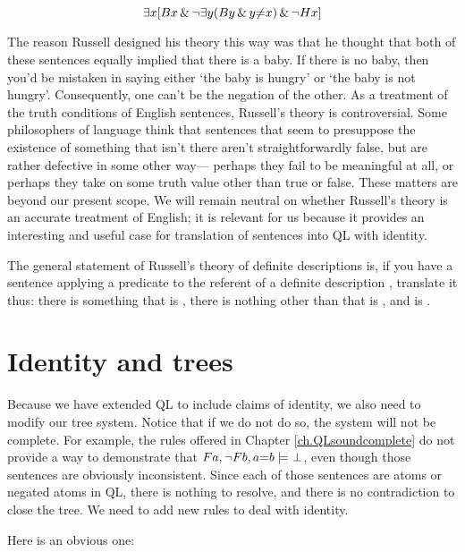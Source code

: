 \begin{equation*}
\exists x [Bx \,\&\, \neg \exists y (By \,\&\, y {\neq} x) \,\&\, \neg Hx]
\end{equation*}

The reason Russell designed his theory this way was that he thought that both of these sentences equally implied that there is a baby. If there is no baby, then you'd be mistaken in saying either `the baby is hungry' or `the baby is not hungry'. Consequently, one can't be the negation of the other. As a treatment of the truth conditions of English sentences, Russell's theory is controversial. Some philosophers of language think that sentences that seem to presuppose the existence of something that isn't there aren't straightforwardly false, but are rather defective in some other way--- perhaps they fail to be meaningful at all, or perhaps they take on some truth value other than true or false. These matters are beyond our present scope. We will remain neutral on whether Russell's theory is an accurate treatment of English; it is relevant for us because it provides an interesting and useful case for translation of sentences into QL with identity.

The general statement of Russell's theory of definite descriptions is, if you have a sentence applying a predicate  to the referent of a definite description , translate it thus: there is something  that is , there is nothing other than  that is , and  is .


\section{Identity and trees}
\label{sec.identity.trees}

Because we have extended QL to include claims of identity, we also need to modify our tree system. Notice that if we do not do so, the system will not be complete. For example, the rules offered in Chapter \ref{ch.QLsoundcomplete} do not provide a way to demonstrate that $Fa, \neg Fb, a{=}b \models \bot$, even though those sentences are obviously inconsistent. Since each of those sentences are atoms or negated atoms in QL, there is nothing to resolve, and there is no contradiction to close the tree. We need to add new rules to deal with identity.

Here is an obvious one:


